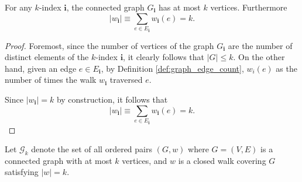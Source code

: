 


\begin{lemma}
  \label{lem:graph_walk_le_k}
  For any $k$-index $\mathbf{i}$, the connected graph $G_\mathbf{i}$ has at most $k$ vertices. Furthermore
  \[
  |w_\mathbf{i}| \equiv \sum_{e \in E_\mathbf{i}} w_\mathbf{i}(e) = k.
  \]
\end{lemma}
\begin{proof}

  Foremost, since the number of vertices of the graph $G_\mathbf{i}$ 
  are the number of distinct elements of the $k$-index $\mathbf{i}$, it clearly follows that $|G| \leq k$.
  On the other hand, given an edge $e \in E_\mathbf{i}$, by Definition \ref{def:graph_edge_count}, $w_i(e)$ as the number of times the walk $w_\mathbf{i}$ traversed $e$. 

  Since $|w_\mathbf{i}| = k$ by construction, it follows that
  \[
  |w_\mathbf{i}| \equiv \sum_{e \in E_\mathbf{i}} w_\mathbf{i}(e) = k.
  \]
\end{proof}
\begin{definition}
  \label{def:g_k}
  Let $\mathcal{G}_k$ denote the set of all ordered pairs $(G,w)$ where $G = (V,E)$ is a connected graph with at most $k$ vertices, and
  $w$ is a closed walk covering $G$ satisfying $|w| = k$.
\end{definition}



